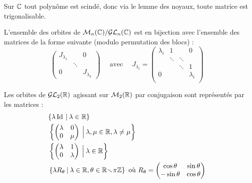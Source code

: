 \begin{example}[Remarque]
Sur $\mathbb{C}$ tout polynôme est scindé, donc via le lemme des noyaux, toute matrice
est trigonalisable.
\end{example}

\begin{theo}

L'ensemble des orbites de $\mathcal{M}_n(\mathbb{C}) / \mathcal{GL}_n(\mathbb{C})$ est en bijection avec
l'ensemble des matrices de la forme suivante (modulo permutation des blocs) :
\begin{displaymath}\begin{pmatrix} J_{\lambda_1} & & 0 \\ & \ddots & \\ 0 & &
J_{\lambda_k} 
\end{pmatrix} \quad \text{ avec } \quad J_{\lambda_i} =\begin{pmatrix}
\lambda_i & 1      &        & 0    \\
          & \ddots & \ddots &      \\
          &        & \ddots & 1    \\
       0   &        &        & \lambda_i\\  \end{pmatrix}\end{displaymath}
\end{theo}

\begin{prop}
 Les orbites de $\mathcal{GL}_2(\mathbb{R})$ agissant sur $\mathcal{M}_2(\mathbb{R})$ par conjugaison sont
représentés par les matrices :
\begin{align}
&   \{\lambda \operatorname{Id} \: | \: \lambda \in \mathbb{R}\} \\
& \left\lbrace\begin{pmatrix} \lambda & 0 \\ 0&  \mu \end{pmatrix} \: \Big| \:
\lambda,\mu \in \mathbb{R}, \lambda \neq\mu \right\rbrace \\
& \left\lbrace\begin{pmatrix} \lambda & 1 \\ 0&  \lambda \end{pmatrix} \: \Big| \:
\lambda\in \mathbb{R} \right\rbrace \\
& \left\lbrace\lambda R_\theta\: | \: \lambda\in \mathbb{R}, \theta \in \mathbb{R} \!\smallsetminus\!{} \pi\mathbb{Z}
\right\rbrace \text{ où } R_\theta = \begin{pmatrix}
\cos \theta & \sin \theta \\ -\sin\theta & \cos\theta \end{pmatrix}
\end{align}

\end{prop}

